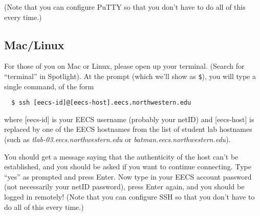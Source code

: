 \documentclass{tufte-handout}
\begin{document}
(Note that you can configure PuTTY so that you don't have to do all of
this every time.)

\subsection{Mac/Linux}

For those of you on Mac or Linux, please open up your terminal. (Search
for ``terminal'' in Spotlight). At the prompt (which we'll show as
\verb|$|), you will type a single command, of the form

\begin{verbatim}
  $ ssh [eecs-id]@[eecs-host].eecs.northwestern.edu
\end{verbatim}

\noindent where [eecs-id] is your EECS username (probably your netID)
and [eecs-host] is replaced by one of the EECS hostnames from the list
of student lab hostnames%
(such as \textit{tlab-03.eecs.northwestern.edu} or
\textit{batman.eecs.northwestern.edu}).


You should get a message saying that the authenticity of the host
can't be established, and you should be asked if you want to continue
connecting.  Type ``yes'' as prompted and press Enter. Now type in your
EECS account password (not necessarily your netID password), press
Enter again, and you should be logged in remotely! (Note that you can
configure SSH so that you don't have to do all of this every time.)
\end{document}

